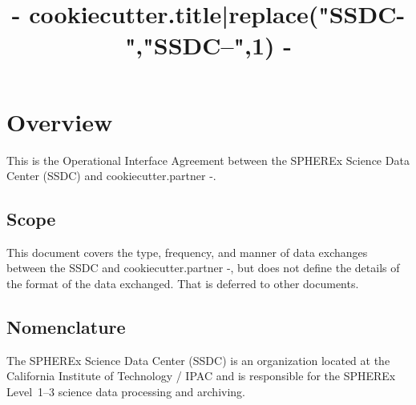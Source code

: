 \documentclass[IF]{spherex}
\title{ {{- cookiecutter.title|replace("SSDC-","SSDC--",1) -}} }
\begin{document}
\maketitle

\begin{dochistory}
\end{dochistory}


\section{Overview}

This is the Operational Interface Agreement between the SPHEREx Science Data Center (SSDC)
and {{ cookiecutter.partner -}}.

\subsection{Scope}


This document covers the type, frequency, and manner of data exchanges between
the SSDC and {{ cookiecutter.partner -}}, but does not define the details of
the format of the data exchanged.
That is deferred to other documents.


\subsection{Nomenclature}

The SPHEREx Science Data Center (SSDC) is an organization located at
the California Institute of Technology / IPAC and is responsible for the
SPHEREx Level~1--3 science data processing and archiving.

\end{document}

